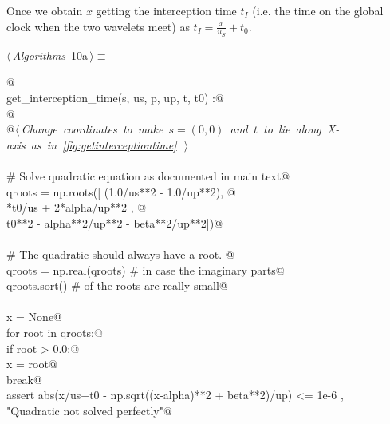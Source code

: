 \documentclass[10pt, english, oneside]{report}
\begin{document}
Once we obtain $x$ getting the interception time $t_I$ (i.e. the time on the global clock 
when the two wavelets meet) as $t_I = \frac{x}{u_S} + t_0$.

\begin{flushleft} \small
\begin{minipage}{\linewidth}\label{scrap6}\raggedright\small
{} $\langle\,${\itshape Algorithms}\nobreak\ {\footnotesize {10a}}$\,\rangle\equiv$
\vspace{-1ex}
\begin{list}{}{} \item
\mbox{}\verb@ @\\
\mbox{}\verb@def get_interception_time(s, us, p, up, t, t0) :@\\
\mbox{}\verb@    @\\
\mbox{}\verb@    @\hbox{$\langle\,${\itshape Change coordinates to make $s=(0,0)$ and $t$ to lie along X-axis as in \autoref{fig:getinterceptiontime}}\nobreak\ {\footnotesize {}}$\,\rangle$}\verb@@\\
\mbox{}\verb@@\\
\mbox{}\verb@    # Solve quadratic equation as documented in main text@\\
\mbox{}\verb@    qroots = np.roots([ (1.0/us**2 - 1.0/up**2), @\\
\mbox{}*t0/us + 2*alpha/up**2 , @\\
\mbox{}\verb@                        t0**2 - alpha**2/up**2 - beta**2/up**2])@\\
\mbox{}\verb@@\\
\mbox{}\verb@    # The quadratic should always have a root. @\\
\mbox{}\verb@    qroots = np.real(qroots) # in case the imaginary parts@\\
\mbox{}\verb@    qroots.sort()            # of the roots are really small@\\
\mbox{}\verb@@\\
\mbox{}\verb@    x = None@\\
\mbox{}\verb@    for root in qroots:@\\
\mbox{}\verb@        if root > 0.0:@\\
\mbox{}\verb@           x = root@\\
\mbox{}\verb@           break@\\
\mbox{}\verb@    assert abs(x/us+t0 - np.sqrt((x-alpha)**2 + beta**2)/up) <= 1e-6 , \@\\
\mbox{}\verb@           "Quadratic not solved perfectly"@\\

\end{list}
\end{minipage}
\end{flushleft}
\end{document}

